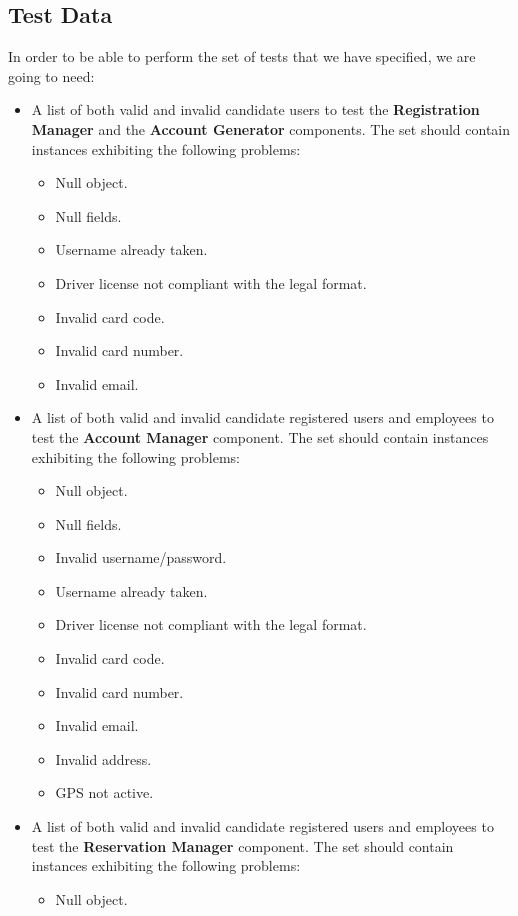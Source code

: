 \subsection{Test Data}
In order to be able to perform the set of tests that we have specified, we are going to need:
\begin{itemize}
	\item A list of both valid and invalid candidate users to test the \textbf{Registration Manager} and the \textbf{Account Generator} components. The set should contain instances exhibiting the following problems: 
	\begin{itemize}
		\item Null object.
		\item Null fields.
		\item Username already taken. 
		\item Driver license not compliant with the legal format.
		\item Invalid card code.
		\item Invalid card number.
		\item Invalid email.
	\end{itemize}
	\item A list of both valid and invalid candidate registered users and employees to test the \textbf{Account Manager} component. The set should contain instances exhibiting the following problems: 
	\begin{itemize}
		\item Null object.
		\item Null fields.
		\item Invalid username/password.
		\item Username already taken. 
		\item Driver license not compliant with the legal format.
		\item Invalid card code.
		\item Invalid card number.
		\item Invalid email.
		\item Invalid address.
		\item GPS not active.
	\end{itemize}
	\item A list of both valid and invalid candidate registered users and employees to test the \textbf{Reservation Manager} component. The set should contain instances exhibiting the following problems: 
	\begin{itemize}
		\item Null object.

\end{itemize}
\end{itemize}
